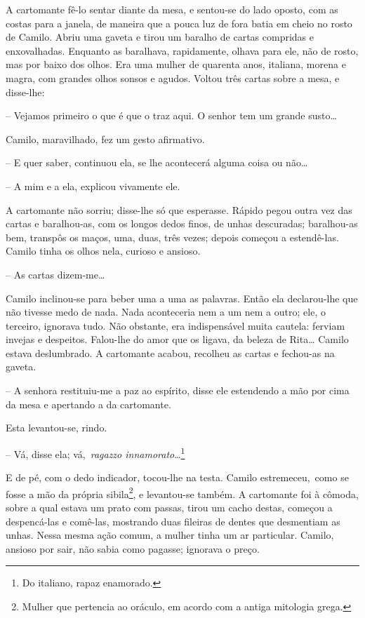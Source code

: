 A cartomante fê-lo sentar diante da mesa, e sentou-se do lado oposto,
com as costas para a janela, de maneira que a pouca luz de fora batia em
cheio no rosto de Camilo. Abriu uma gaveta e tirou um baralho de cartas
compridas e enxovalhadas. Enquanto as baralhava, rapidamente, olhava
para ele, não de rosto, mas por baixo dos olhos. Era uma mulher de
quarenta anos, italiana, morena e magra, com grandes olhos sonsos e
agudos. Voltou três cartas sobre a mesa, e disse-lhe:

-- Vejamos primeiro o que é que o traz aqui. O senhor tem um grande
susto\ldots{}

Camilo, maravilhado, fez um gesto afirmativo.

-- E quer saber, continuou ela, se lhe acontecerá alguma coisa ou
não\ldots{}

-- A mim e a ela, explicou vivamente ele.

A cartomante não sorriu; disse-lhe só que esperasse. Rápido pegou outra
vez das cartas e baralhou-as, com os longos dedos finos, de unhas
descuradas; baralhou-as bem, transpôs os maços, uma, duas, três vezes;
depois começou a estendê-las. Camilo tinha os olhos nela, curioso e
ansioso.

-- As cartas dizem-me\ldots{}

Camilo inclinou-se para beber uma a uma as palavras. Então ela
declarou-lhe que não tivesse medo de nada. Nada aconteceria nem a um nem
a outro; ele, o terceiro, ignorava tudo. Não obstante, era indispensável
muita cautela: ferviam invejas e despeitos. Falou-lhe do amor que os
ligava, da beleza de Rita\ldots{} Camilo estava deslumbrado. A
cartomante acabou, recolheu as cartas e fechou-as na gaveta.

-- A senhora restituiu-me a paz ao espírito, disse ele estendendo a mão
por cima da mesa e apertando a da cartomante.

Esta levantou-se, rindo.

-- Vá, disse ela; vá,~\emph{ragazzo innamorato}\ldots{}\footnote{Do
  italiano, rapaz enamorado.}

E de pé, com o dedo indicador, tocou-lhe na testa. Camilo
estremeceu,~como se fosse a mão da própria sibila\footnote{Mulher que
  pertencia ao oráculo, em acordo com a antiga mitologia grega.}, e
levantou-se também. A cartomante foi à cômoda, sobre a qual estava um
prato com passas, tirou um cacho destas, começou a despencá-las e
comê-las, mostrando duas fileiras de dentes que desmentiam as unhas.
Nessa mesma ação comum, a mulher tinha um ar particular. Camilo, ansioso
por sair, não sabia como pagasse; ignorava o preço.

